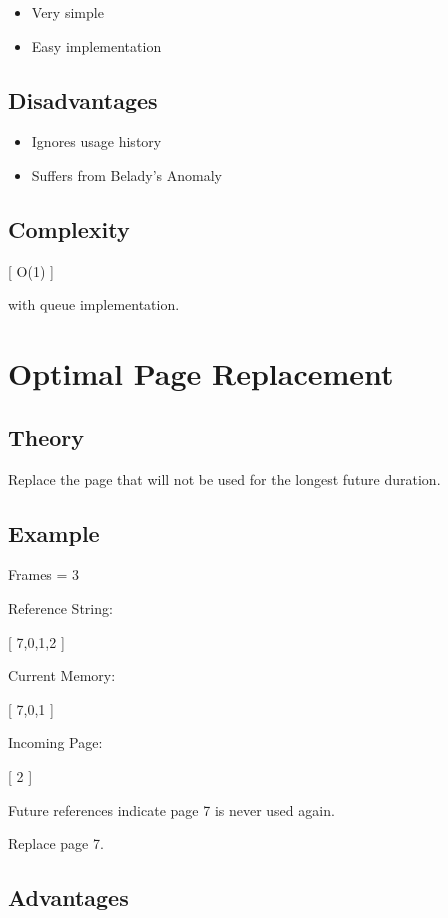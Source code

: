 \begin{itemize}
\item Very simple
\item Easy implementation
\end{itemize}

\subsection{Disadvantages}

\begin{itemize}
\item Ignores usage history
\item Suffers from Belady's Anomaly
\end{itemize}

\subsection{Complexity}

[
O(1)
]

with queue implementation.

\section{Optimal Page Replacement}

\subsection{Theory}

Replace the page that will not be used for the longest future duration.

\subsection{Example}

Frames = 3

Reference String:

[
7,0,1,2
]

Current Memory:

[
7,0,1
]

Incoming Page:

[
2
]

Future references indicate page 7 is never used again.

Replace page 7.

\subsection{Advantages}

